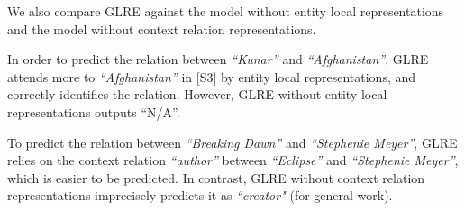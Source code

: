 \documentclass[11pt,a4paper]{article}
\begin{document}
We also compare GLRE against the model without entity local representations and the model without context relation representations.
\begin{compactenum}[(4)]
\item In order to predict the relation between \textit{``Kunar''} and \textit{``Afghanistan''}, GLRE attends more to \textit{``Afghanistan''} in [S3] by entity local representations, and correctly identifies the relation. However, GLRE without entity local representations outputs ``N/A''.

\item To predict the relation between \textit{``Breaking Dawn''} and \textit{``Stephenie Meyer''}, GLRE relies on the context relation \textit{``author''} between \textit{``Eclipse''} and \textit{``Stephenie Meyer''}, which is easier to be predicted. In contrast, GLRE without context relation representations imprecisely predicts it as \textit{``creator"} (for general work).
\end{compactenum}
\end{document}
